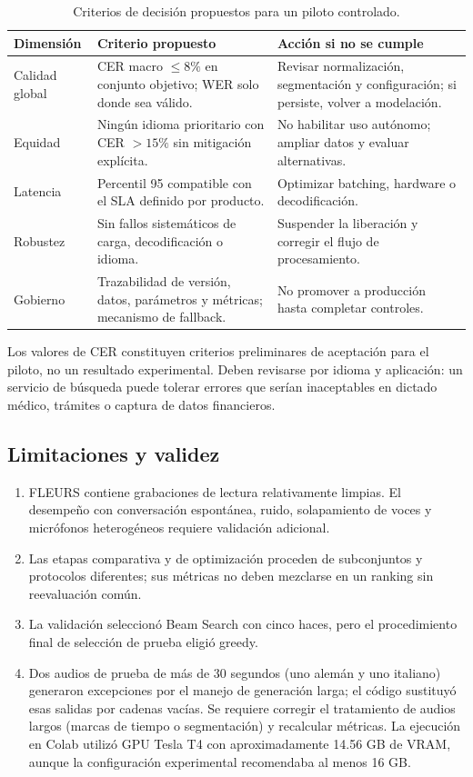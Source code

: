 \documentclass[11pt,letterpaper]{article}
\begin{document}
\begin{table}[H]\centering
\caption{Criterios de decisión propuestos para un piloto controlado.}
\begin{tabularx}{\textwidth}{p{}XX}\toprule
\textbf{Dimensión} & \textbf{Criterio propuesto} & \textbf{Acción si no se cumple}\\\midrule
Calidad global & CER macro $\leq 8\%$ en conjunto objetivo; WER solo donde sea válido. & Revisar normalización, segmentación y configuración; si persiste, volver a modelación.\\
Equidad & Ningún idioma prioritario con CER $>15\%$ sin mitigación explícita. & No habilitar uso autónomo; ampliar datos y evaluar alternativas.\\
Latencia & Percentil 95 compatible con el SLA definido por producto. & Optimizar batching, hardware o decodificación.\\
Robustez & Sin fallos sistemáticos de carga, decodificación o idioma. & Suspender la liberación y corregir el flujo de procesamiento.\\
Gobierno & Trazabilidad de versión, datos, parámetros y métricas; mecanismo de fallback. & No promover a producción hasta completar controles.\\\bottomrule\end{tabularx}\end{table}

Los valores de CER constituyen criterios preliminares de aceptación para el piloto, no un resultado experimental. Deben revisarse por idioma y aplicación: un servicio de búsqueda puede tolerar errores que serían inaceptables en dictado médico, trámites o captura de datos financieros.

\subsection{Limitaciones y validez}

\begin{enumerate}
\item FLEURS contiene grabaciones de lectura relativamente limpias. El desempeño con conversación espontánea, ruido, solapamiento de voces y micrófonos heterogéneos requiere validación adicional.
\item Las etapas comparativa y de optimización proceden de subconjuntos y protocolos diferentes; sus métricas no deben mezclarse en un ranking sin reevaluación común.
\item La validación seleccionó Beam Search con cinco haces, pero el procedimiento final de selección de prueba eligió greedy.
\item Dos audios de prueba de más de 30 segundos (uno alemán y uno italiano) generaron excepciones por el manejo de generación larga; el código sustituyó esas salidas por cadenas vacías. Se requiere corregir el tratamiento de audios largos (marcas de tiempo o segmentación) y recalcular métricas. La ejecución en Colab utilizó GPU Tesla T4 con aproximadamente 14.56 GB de VRAM, aunque la configuración experimental recomendaba al menos 16 GB.
\end{enumerate}
\end{document}
